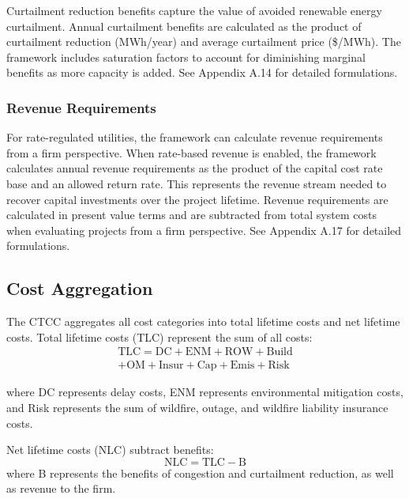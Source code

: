\documentclass[11pt,twocolumn,a4paper]{article}
\begin{document}
Curtailment reduction benefits capture the value of avoided renewable energy curtailment. Annual curtailment benefits are calculated as the product of curtailment reduction (MWh/year) and average curtailment price (\$/MWh). The framework includes saturation factors to account for diminishing marginal benefits as more capacity is added. See Appendix A.14 for detailed formulations.

\subsubsection{Revenue Requirements}

For rate-regulated utilities, the framework can calculate revenue requirements from a firm perspective. When rate-based revenue is enabled, the framework calculates annual revenue requirements as the product of the capital cost rate base and an allowed return rate. This represents the revenue stream needed to recover capital investments over the project lifetime. Revenue requirements are calculated in present value terms and are subtracted from total system costs when evaluating projects from a firm perspective. See Appendix A.17 for detailed formulations.

\subsection{Cost Aggregation}

The CTCC aggregates all cost categories into total lifetime costs and net lifetime costs. Total lifetime costs (TLC) represent the sum of all costs:
\begin{equation}
\begin{split}
\text{TLC} = \text{DC} + \text{ENM} + \text{ROW} + \text{Build} \\
+ \text{OM}            + \text{Insur} + \text{Cap} + \text{Emis} + \text{Risk}
\end{split}
\label{eq:TLC}
\end{equation}

where DC represents delay costs, ENM represents environmental mitigation costs, and Risk represents the sum of wildfire, outage, and wildfire liability insurance costs.

Net lifetime costs (NLC) subtract benefits:
\begin{equation}
\text{NLC} = \text{TLC}  - \text{B}
\label{eq:NLC}
\end{equation}
where B represents the benefits of congestion and curtailment reduction, as well as revenue to the firm.
\end{document}
